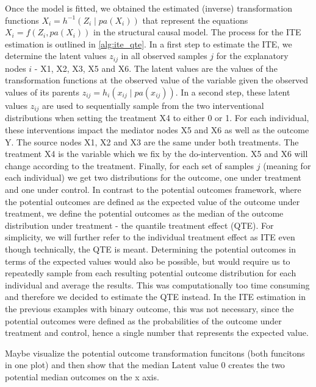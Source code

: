 Once the model is fitted, we obtained the estimated (inverse) transformation functions $X_i = h^{-1}(Z_i \mid pa(X_i))$ that represent the equations $X_i = f(Z_i, pa(X_i))$ in the structural causal model. The process for the ITE estimation is outlined in \ref{alg:ite_qte}. In a first step to estimate the ITE, we determine the latent values $z_{ij}$ in all observed samples $j$ for the explanatory nodes $i$ - X1, X2, X3, X5 and X6. The latent values are the values of the transformation functions at the observed value of the variable given the observed values of its parents $z_{ij} = h_i(x_{ij} \mid pa(x_{ij}))$. In a second step, these latent values $z_{ij}$ are used to sequentially sample from the two interventional distributions when setting the treatment X4 to either 0 or 1. For each individual, these interventions impact the mediator nodes X5 and X6 as well as the outcome Y. The source nodes X1, X2 and X3 are the same under both treatments. The treatment X4 is the variable which we fix by the do-intervention. X5 and X6 will change according to the treatment. Finally, for each set of samples $j$ (meaning for each individual) we get two distributions for the outcome, one under treatment and one under control. In contrast to the potential outcomes framework, where the potential outcomes are defined as the expected value of the outcome under treatment, we define the potential outcomes as the median of the outcome distribution under treatment - the quantile treatment effect (QTE). For simplicity, we will further refer to the individual treatment effect as ITE even though technically, the QTE is meant. Determining the potential outcomes in terms of the expected values would also be possible, but would require us to repeatedly sample from each resulting potential outcome distribution for each individual and average the results. This was computationally too time consuming and therefore we decided to estimate the QTE instead. In the ITE estimation in the previous examples with binary outcome, this was not necessary, since the potential outcomes were defined as the probabilities of the outcome under treatment and control, hence a single number that represents the expected value.


Maybe visualize the potential outcome transformation funcitons (both funcitons in one plot) and then show that the median Latent value 0 creates the two potential median outcomes on the x axis.

